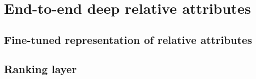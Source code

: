

\section{End-to-end deep relative attributes}

\subsection{Fine-tuned representation of relative attributes}

\subsection{Ranking layer}

